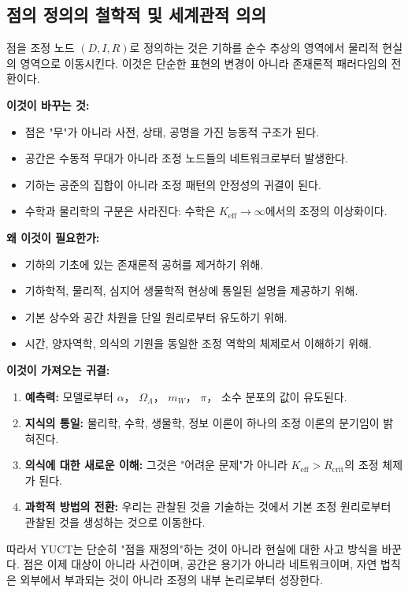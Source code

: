 \documentclass[12pt,a4paper]{article}
\newcommand{\Keff}{K_{\mathrm{eff}}}
\newcommand{\Rcrit}{R_{\mathrm{crit}}}
\begin{document}
	\subsection*{점의 정의의 철학적 및 세계관적 의의}
	
	점을 조정 노드 \((D, I, R)\)로 정의하는 것은 기하를 순수 추상의 영역에서 물리적 현실의 영역으로 이동시킨다. 이것은 단순한 표현의 변경이 아니라 존재론적 패러다임의 전환이다.
	
	\medskip
	\textbf{이것이 바꾸는 것:}
	\begin{itemize}
		\item 점은 "무"가 아니라 사전, 상태, 공명을 가진 능동적 구조가 된다.
		\item 공간은 수동적 무대가 아니라 조정 노드들의 네트워크로부터 발생한다.
		\item 기하는 공준의 집합이 아니라 조정 패턴의 안정성의 귀결이 된다.
		\item 수학과 물리학의 구분은 사라진다: 수학은 \(\Keff \to \infty\)에서의 조정의 이상화이다.
	\end{itemize}
	
	\medskip
	\textbf{왜 이것이 필요한가:}
	\begin{itemize}
		\item 기하의 기초에 있는 존재론적 공허를 제거하기 위해.
		\item 기하학적, 물리적, 심지어 생물학적 현상에 통일된 설명을 제공하기 위해.
		\item 기본 상수와 공간 차원을 단일 원리로부터 유도하기 위해.
		\item 시간, 양자역학, 의식의 기원을 동일한 조정 역학의 체제로서 이해하기 위해.
	\end{itemize}
	
	\medskip
	\textbf{이것이 가져오는 귀결:}
	\begin{enumerate}
		\item \textbf{예측력:} 모델로부터 \(\alpha\)， \(\Omega_\Lambda\)， \(m_W\)， \(\pi\)， 소수 분포의 값이 유도된다.
		\item \textbf{지식의 통일:} 물리학, 수학, 생물학, 정보 이론이 하나의 조정 이론의 분기임이 밝혀진다.
		\item \textbf{의식에 대한 새로운 이해:} 그것은 "어려운 문제"가 아니라 \(\Keff > \Rcrit\)의 조정 체제가 된다.
		\item \textbf{과학적 방법의 전환:} 우리는 관찰된 것을 기술하는 것에서 기본 조정 원리로부터 관찰된 것을 생성하는 것으로 이동한다.
	\end{enumerate}
	
	\medskip
	따라서 YUCT는 단순히 "점을 재정의"하는 것이 아니라 현실에 대한 사고 방식을 바꾼다. 점은 이제 대상이 아니라 사건이며, 공간은 용기가 아니라 네트워크이며, 자연 법칙은 외부에서 부과되는 것이 아니라 조정의 내부 논리로부터 성장한다.
	
\end{document}
